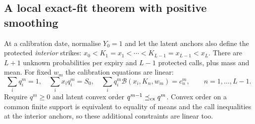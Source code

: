 \documentclass[11pt,a4paper]{article}
\numberwithin{equation}{section}
\theoremstyle{definition}\newtheorem{definition}[theorem]{Definition}
\theoremstyle{remark}\newtheorem{remark}[theorem]{Remark}
\newcommand{\Black}{\mathcal B}\newcommand{\LC}{\mathcal L}
\begin{document}
\subsection{A local exact-fit theorem with positive smoothing}
At a calibration date, normalise $Y_0=1$ and let the latent anchors also define the protected \emph{interior} strikes: $x_0<K_1=x_1<\cdots<K_{L-1}=x_{L-1}<x_L$. There are $L+1$ unknown probabilities per expiry and $L-1$ protected calls, plus mass and mean. For fixed $w_m$ the calibration equations are linear:
\begin{equation}
 \sum_iq_i^m=1,\quad \sum_ix_iq_i^m=S_0,\quad
 \sum_iq_i^m\Black(x_i,K_n,w_m)=c_n^m,
 \qquad n=1,\ldots,L-1.
 \label{eq:calibration}
\end{equation}
Require $q^m\geq0$ and latent convex order $q^{m-1}\preceq_{\mathrm{cx}} q^m$. Convex order on a common finite support is equivalent to equality of means and the call inequalities at the interior anchors, so these additional constraints are linear too.
\end{document}
